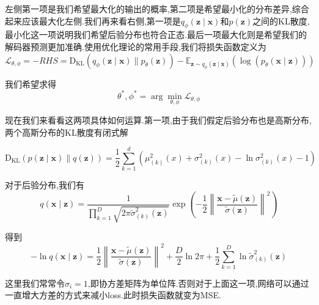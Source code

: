 	左侧第一项是我们希望最大化的输出的概率,第二项是希望最小化的分布差异,综合起来应该最大化左侧.我们再来看右侧,第一项是$q_{\phi}(\bm{z} \mid \bm{x})$和$p(\bm z)$之间的KL散度,最小化这一项说明我们希望后验分布也符合正态.最后一项最大化则是希望我们的解码器预测更加准确.使用优化理论的常用手段,我们将损失函数定义为
	\begin{equation}
		\mathcal{L}_{\theta, \phi} = -RHS = \operatorname{D_{KL}}\left(q_{\phi}(\bm{z} \mid \bm{x}) \| p_{\theta}(\bm{z})\right)-\mathbb E_{\bm{z} \sim q_{\phi}(\bm{z} \mid \bm{x})}\left(\log \left(p_{\theta}(\bm{x} \mid \bm{z})\right)\right)
	\end{equation}

	我们希望求得
	\begin{equation}
		\theta^{*}, \phi^{*} = \arg\min_{\theta, \phi} \mathcal{L}_{\theta, \phi}
	\end{equation}

	现在我们来看看这两项具体如何运算.第一项,由于我们假定后验分布也是高斯分布,两个高斯分布的KL散度有闭式解
	
	\begin{equation}
		\operatorname{D_{KL}}(p(\bm z \mid \bm x) \| q(\bm z))=\frac{1}{2} \sum_{k=1}^{d}\left(\mu_{(k)}^{2}(x)+\sigma_{(k)}^{2}(x)-\ln \sigma_{(k)}^{2}(x)-1\right)
	\end{equation}
	
	对于后验分布,我们有
	\begin{equation}
		q(\bm x \mid \bm z)=\frac{1}{\prod_{k=1}^{D} \sqrt{2 \pi \tilde{\sigma}_{(k)}^{2}(\bm z)}} \exp \left(-\frac{1}{2}\left\|\frac{\bm x-\tilde{\mu}(\bm z)}{\tilde{\sigma}(\bm z)}\right\|^{2}\right)
	\end{equation}

	得到
	\begin{equation}
		-\ln q(\bm x \mid \bm z)=\frac{1}{2}\left\|\frac{\bm x-\tilde{\mu}(\bm z)}{\tilde{\sigma}(\bm z)}\right\|^{2}+\frac{D}{2} \ln 2 \pi+\frac{1}{2} \sum_{k=1}^{D} \ln \tilde{\sigma}_{(k)}^{2}(\bm z)
	\end{equation}

	这里我们常常令$\sigma_i = 1$,即协方差矩阵为单位阵.否则对于上面这一项,网络可以通过一直增大方差的方式来减小loss.此时损失函数就变为MSE.
	
	\clearpage
	
	